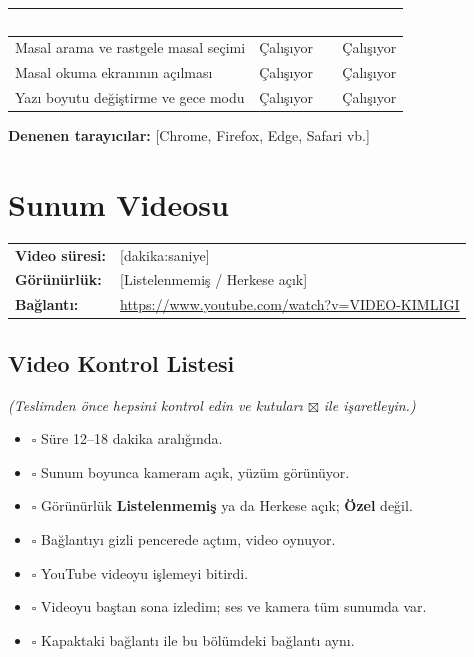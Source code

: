 \documentclass[12pt,a4paper]{article}
\newcommand{\aciklama}[1]{{\color{gray}\itshape (#1)}}
\newcommand{\youtubelink}{\url{https://www.youtube.com/watch?v=VIDEO-KIMLIGI}}
\begin{document}
\begin{center}
\begin{tabular}{@{}P{6cm}P{3.4cm}P{3.4cm}@{}}
\toprule
{}\textcolor{white}{\textbf{Özellik}} & \textcolor{white}{\textbf{Bilgisayar}} & \textcolor{white}{\textbf{Telefon}} \\
\midrule
\relax Masal arama ve rastgele masal seçimi & Çalışıyor & Çalışıyor \\
\relax Masal okuma ekranının açılması & Çalışıyor & Çalışıyor \\
\relax Yazı boyutu değiştirme ve gece modu & Çalışıyor & Çalışıyor \\
\bottomrule
\end{tabular}
\end{center}

\textbf{Denenen tarayıcılar:} [Chrome, Firefox, Edge, Safari vb.]

\section{Sunum Videosu}
\begin{center}
\begin{tabular}{@{}ll@{}}
\textbf{Video süresi:} & [dakika:saniye] \quad \aciklama{12--18 dakika olmalıdır} \\
\textbf{Görünürlük:} & [Listelenmemiş / Herkese açık] \\
\textbf{Bağlantı:} & \youtubelink \\
\end{tabular}
\end{center}

\subsection{Video Kontrol Listesi}
\aciklama{Teslimden önce hepsini kontrol edin ve kutuları $\boxtimes$ ile işaretleyin.}
\begin{itemize}
  \item[] $\square$ Süre 12--18 dakika aralığında.
  \item[] $\square$ Sunum boyunca kameram açık, yüzüm görünüyor.
  \item[] $\square$ Görünürlük \textbf{Listelenmemiş} ya da Herkese açık; \textbf{Özel} değil.
  \item[] $\square$ Bağlantıyı gizli pencerede açtım, video oynuyor.
  \item[] $\square$ YouTube videoyu işlemeyi bitirdi.
  \item[] $\square$ Videoyu baştan sona izledim; ses ve kamera tüm sunumda var.
  \item[] $\square$ Kapaktaki bağlantı ile bu bölümdeki bağlantı aynı.
\end{itemize}
\end{document}
